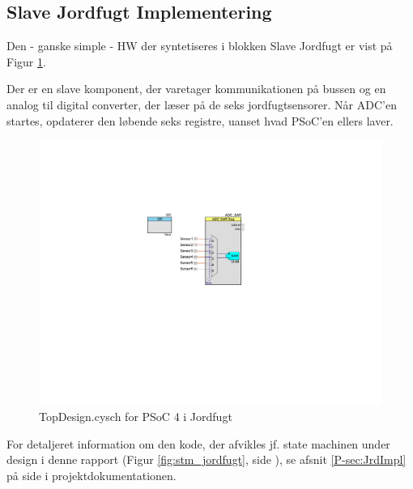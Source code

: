 \subsection{Slave Jordfugt Implementering}
\label{ch:slave_jordfugt_impl}

Den - ganske simple - HW der syntetiseres i blokken Slave Jordfugt er vist på Figur \ref{fig:topdesign_jordfugt}. 

Der er en \IIC slave komponent, der varetager kommunikationen på \IIC bussen og en analog til digital converter, der læser på de seks jordfugtsensorer. 
Når ADC'en startes, opdaterer den løbende seks registre, uanset hvad PSoC'en ellers laver. 

\begin{figure}[h]
\centering 
\includegraphics[width={\textwidth-8cm}, trim = 250 270 310 160, clip=true] {../fig/TopDesign_Jordfugt.pdf}
\caption{TopDesign.cysch for PSoC 4 i Jordfugt}
\label{fig:topdesign_jordfugt}
\end{figure}

For detaljeret information om den kode, der afvikles jf. state machinen under design i denne rapport (Figur \ref{fig:stm_jordfugt}, side \pageref{fig:stm_jordfugt}), se afsnit \ref{P-sec:JrdImpl}  på side \pageref{P-sec:JrdImpl} i projektdokumentationen.